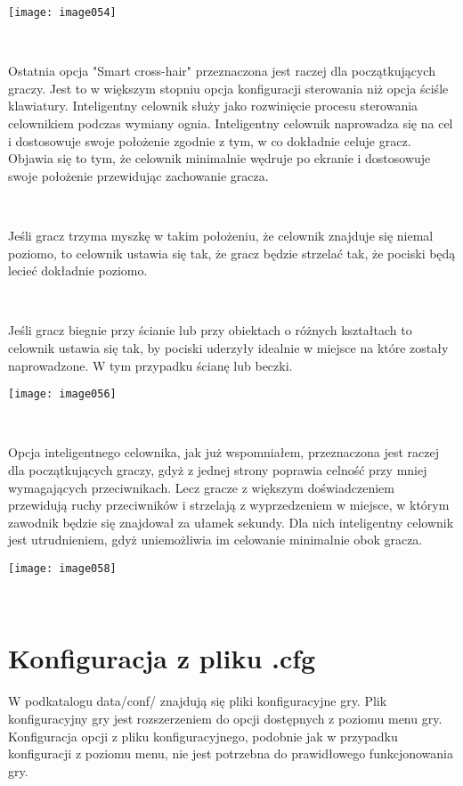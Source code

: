 \documentclass[licencjacka]{pracamgr}
\begin{document}
\begin{center}
\texttt{[image: image054]}
\end{center}

\ \

Ostatnia opcja "Smart cross-hair" przeznaczona jest raczej dla początkujących graczy. Jest to w większym stopniu opcja konfiguracji sterowania niż opcja ściśle klawiatury. Inteligentny celownik służy jako rozwinięcie procesu sterowania celownikiem podczas wymiany ognia. Inteligentny celownik naprowadza się na cel i dostosowuje swoje położenie zgodnie z tym, w co dokładnie celuje gracz. Objawia się to tym, że celownik minimalnie wędruje po ekranie i dostosowuje swoje położenie przewidując zachowanie gracza.

\ \

Jeśli gracz trzyma myszkę w takim położeniu, że celownik znajduje się niemal poziomo, to celownik ustawia się tak, że gracz będzie strzelać tak, że pociski będą lecieć dokładnie poziomo.

\ \

Jeśli gracz biegnie przy ścianie lub przy obiektach o różnych kształtach to celownik ustawia się tak, by pociski uderzyły idealnie w miejsce na które zostały naprowadzone. W tym przypadku ścianę lub beczki.

\begin{center}
\texttt{[image: image056]}
\end{center}

\ \

Opcja inteligentnego celownika, jak już wspomniałem, przeznaczona jest raczej dla początkujących graczy, gdyż z jednej strony poprawia celność przy mniej wymagających przeciwnikach. Lecz gracze z większym doświadczeniem przewidują ruchy przeciwników i strzelają z wyprzedzeniem w miejsce, w którym zawodnik będzie się znajdował za ułamek sekundy. Dla nich inteligentny celownik jest utrudnieniem, gdyż uniemożliwia im celowanie minimalnie obok gracza.

\begin{center}
\texttt{[image: image058]}
\end{center}

\ \

\section{Konfiguracja z pliku .cfg}

W podkatalogu data/conf/ znajdują się pliki konfiguracyjne gry.
Plik konfiguracyjny gry jest rozszerzeniem do opcji dostępnych z poziomu menu gry.
Konfiguracja opcji z pliku konfiguracyjnego, podobnie jak w przypadku konfiguracji z poziomu menu, nie jest potrzebna do prawidłowego funkcjonowania gry.
\end{document}
